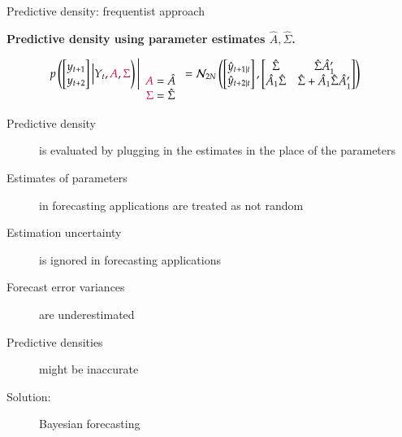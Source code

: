 \documentclass[notes,blackandwhite,mathsans,usenames,dvipsnames]{beamer}
\begin{document}
\begin{frame}{Predictive density: frequentist approach}

\textbf{Predictive density using parameter estimates $\hat{A}, \hat\Sigma$.}

\begin{align*}
p\left(\begin{bmatrix}y_{t+1}\\ y_{t+2}\end{bmatrix}\Big|Y_t, {\color{purple}A},{\color{purple}\Sigma}\right)\Bigg|_{\begin{array}{c}{\color{purple}A}=\hat{A}\\ {\color{purple}\Sigma}=\hat\Sigma\end{array}} &= \mathcal{N}_{2N}\left(\begin{bmatrix} \hat{y}_{t+1|t} \\ \hat{y}_{t+2|t} \end{bmatrix}, \begin{bmatrix} \hat\Sigma & \hat\Sigma \hat{A}_1' \\ \hat{A}_1\hat\Sigma & \hat\Sigma + \hat{A}_1\hat\Sigma \hat{A}_1' \end{bmatrix}\right)
\end{align*} 

\begin{description}
\item[Predictive density]{\color{mcxs2} is evaluated by plugging in the estimates in the place of the parameters}
\item[Estimates of parameters]{\color{mcxs2}in forecasting applications are treated as not random}
\item[Estimation uncertainty]{\color{mcxs2}is ignored in forecasting applications}
\item[Forecast error variances]{\color{mcxs2}are underestimated}
\item[Predictive densities]{\color{mcxs2}might be inaccurate}
\item[Solution:]{\color{purple}Bayesian forecasting}
\end{description}

\end{frame}
\end{document}
